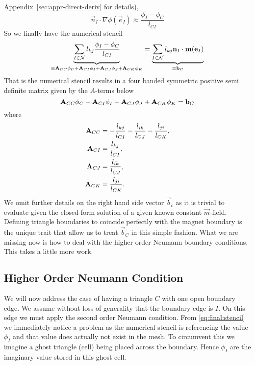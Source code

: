 \documentclass[preprint,nocopyrightspace]{sigplanconf}
\begin{document}
Appendix~\ref{sec:appr-direct-deriv} for details),
\begin{equation}
  \vec n_I \cdot \nabla \phi(\vec e_I) \approx \frac{  \phi_I - \phi_C  }{ l_{CI}} 
\end{equation}
So we finally have the numerical stencil
\begin{equation}
  \underbrace{\sum_{I \in \mathcal{N}}  l_{kj} \frac{  \phi_I - \phi_C  }{
      l_{CI}}}_{
\equiv
\mathbf{A} _{CC} \phi_C + \mathbf{A} _{CI} \phi_I + \mathbf{A} _{CJ} \phi_J + \mathbf{A} _{CK} \phi_K 
}
  =
\underbrace{
  \sum_{I \in \mathcal{N}}  l_{kj} \mathbf{n} _I \cdot \mathbf{m} (\mathbf{e} _I)
}_{\equiv \mathbf{b} _C}
\end{equation}
That is the numerical stencil results in a four banded symmetric
positive semi definite matrix given by the $A$-terms below
\begin{equation}
  \label{eq:final:stencil}
  \mathbf{A} _{CC} \phi_C + \mathbf{A} _{CI} \phi_I + \mathbf{A} _{CJ} \phi_J + \mathbf{A} _{CK} \phi_K
  =  
  \mathbf{b} _C
\end{equation}
where
\begin{subequations}
\begin{align}
  \mathbf{A} _{CC} &= - \frac{ l_{kj} }{ l_{CI}} - \frac{ l_{ik} }{
    l_{CJ}} - \frac{  l_{ji} }{ l_{CK}}, \\
  \mathbf{A} _{CI} &=  \frac{  l_{kj} }{ l_{CI}},\\
  \mathbf{A} _{CJ} &= \frac{ l_{ik} }{ l_{CJ}}, \\
  \mathbf{A} _{CK} &=  \frac{  l_{ji} }{ l_{CK}}. 
\end{align}  
\end{subequations}
We omit further details on the right hand side vector $\vec b_c$ as it
is trivial to evaluate given the closed-form solution of a given known
constant $\vec m$-field.  Defining triangle boundaries to coincide
perfectly with the magnet boundary is the unique trait that allow us
to treat $\vec b_C$ in this simple fashion.  What we are missing now
is how to deal with the higher order Neumann boundary conditions. This
takes a little more work.


\subsection{Higher Order Neumann Condition}
\label{sec:higher-order-neumann}
We will now address the case of having a triangle $C$ with one open
boundary edge. We assume without loss of generality that the boundary
edge is $I$. On this edge we must apply the second order Neumann
condition. From \eqref{eq:final:stencil} we immediately notice a
problem as the numerical stencil is referencing the value $\phi_I$ and
that value does actually not exist in the mesh. To circumvent this we
imagine a ghost triangle (cell) being placed across the
boundary. Hence $\phi_I$ are the imaginary value stored in this ghost
cell.
\end{document}
